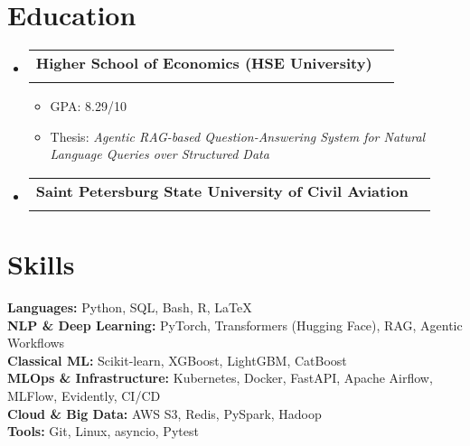 \documentclass[letterpaper,11pt]{article}
\makeatletter
\newcommand{\resumeItem}[1]{
  \item\small{#1}
}
\newcommand{\resumeSubheading}[4]{
  \vspace{-4pt}\item
    \begin{tabular*}{0.97\textwidth}[t]{l@{\extracolsep{\fill}}r}
      \textbf{#1} & \normalfont{#2} \\[1pt]
      \normalfont{#3} & \textit{#4} \\
    \end{tabular*}\vspace{-4pt}
}
\newcommand{\resumeSubHeadingListStart}{\begin{itemize}[leftmargin=0.15in, label={}]}
\newcommand{\resumeSubHeadingListEnd}{\end{itemize}}
\newcommand{\resumeItemListStart}{\begin{itemize}}
\newcommand{\resumeItemListEnd}{\end{itemize}}
\makeatother
\begin{document}
\section{Education}
  \resumeSubHeadingListStart
    \resumeSubheading
    {Higher School of Economics (HSE University)}{Sep 2023 -- Jun 2025}
      {Master's degree in Machine Learning and High Load Systems}{}
      \resumeItemListStart
        \resumeItem{GPA: 8.29/10}
        \resumeItem{Thesis: \textit{Agentic RAG-based Question-Answering System for Natural Language Queries over Structured Data}}
      \resumeItemListEnd
    \resumeSubheading
      {Saint Petersburg State University of Civil Aviation}{Sep 2016 -- Jun 2021}
      {Bachelor's degree in Maintenance of Aircraft and Engines}{}
  \resumeSubHeadingListEnd

\section{Skills}
  \resumeSubHeadingListStart
    \small{\item{
      \textbf{Languages:}{ Python, SQL, Bash, R, LaTeX} \\ \vspace*{3pt}
      \textbf{NLP \& Deep Learning:}{ PyTorch, Transformers (Hugging Face), RAG, Agentic Workflows} \\ \vspace*{3pt}
      \textbf{Classical ML:}{ Scikit-learn, XGBoost, LightGBM, CatBoost} \\ \vspace*{3pt}
      \textbf{MLOps \& Infrastructure:}{ Kubernetes, Docker, FastAPI, Apache Airflow, MLFlow, Evidently, CI/CD} \\ \vspace*{3pt}
      \textbf{Cloud \& Big Data:}{ AWS S3, Redis, PySpark, Hadoop} \\ \vspace*{3pt}
      \textbf{Tools:}{ Git, Linux, asyncio, Pytest} \\
    }}
  \resumeSubHeadingListEnd
\end{document}
